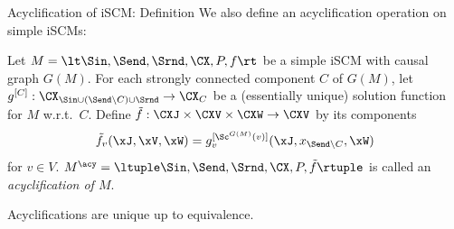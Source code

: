 \begin{frame}{Acyclification of iSCM: Definition}
  We also define an acyclification operation on simple iSCMs:
  \begin{Def}[\ref{def:scm_acyclification}]
    Let $M = \lt \Sin, \Send, \Srnd, \CX, P, f \rt$ be a simple iSCM with causal graph $G(M)$.
    For each strongly connected component $C$ of $G(M)$, let 
    $g^{[C]} : \CX_{\Sin \cup (\Send \setminus C) \cup \Srnd} \to \CX_C$
    be a (essentially unique) solution function for $M$ w.r.t.\ $C$.
    Define $\tilde{f} : \CXJ \times \CXV \times \CXW \to \CXV$ by its components
    $$\tilde{f}_v(\xJ,\xV,\xW) = g^{[\Sc^{G(M)}(v)]}_v(\xJ,x_{\Send\setminus C},\xW)$$
    for $v \in V$.
    $M^\acy = \ltuple \Sin, \Send, \Srnd, \CX, P, \tilde{f} \rtuple$ is called an
    \emph{acyclification of $M$}.
  \end{Def}
  Acyclifications are unique up to equivalence.
\end{frame}

